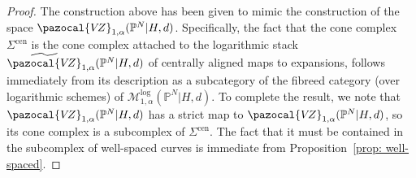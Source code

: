 \documentclass[11pt]{amsart}
\newcommand{\VZ}{\pazocal{V\!Z}}
\theoremstyle{definition}
\theoremstyle{definition}
\begin{document}
\begin{proof}
The construction above has been given to mimic the construction of the space $
\VZ_{1,\alpha}(\mathbb P^N|H,d)$. Specifically, the fact that the cone complex $\Sigma^{\mathrm{cen}}$ is the cone complex attached to the logarithmic stack $\widetilde{\VZ}_{1,\alpha}(\mathbb P^N|H,d)$ of centrally aligned maps to expansions, follows immediately from its description as a subcategory of the fibreed category (over logarithmic schemes) of $\mathcal M^{\mathrm{log}}_{1,\alpha}(\mathbb P^N|H,d)$. To complete the result, we note that $
\VZ_{1,\alpha}(\mathbb P^N|H,d)$ has a strict map to $
\VZ_{1,\alpha}(\mathbb P^N|H,d)$, so its cone complex is a subcomplex of $\Sigma^{\mathrm{cen}}$. The fact that it must be contained in the subcomplex of well-spaced curves is immediate from Proposition~\ref{prop: well-spaced}.
\end{proof}
\end{document}
